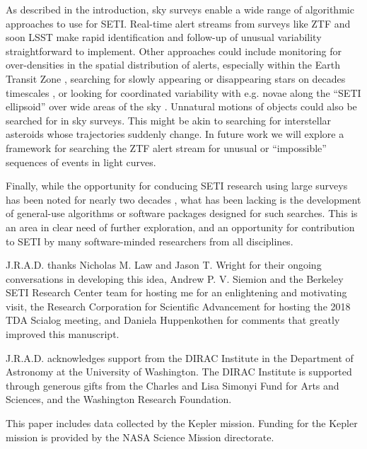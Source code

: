 \documentclass[twocolumn]{aastex62}
\begin{document}
As described in the introduction, sky surveys enable a wide range of algorithmic approaches to use for SETI. Real-time alert streams from surveys like ZTF and soon LSST \citep[e.g.][]{schwamb2019} make rapid identification and follow-up of unusual variability straightforward to implement. Other approaches could include monitoring for over-densities in the spatial distribution of alerts, especially within the Earth Transit Zone \citep{heller2016}, searching for slowly appearing or disappearing stars on decades timescales \citep{villarroel2016}, or looking for coordinated variability with e.g. novae along the ``SETI ellipsoid'' over wide areas of the sky \citep{lemarchand1994}. Unnatural motions of objects could also be searched for in sky surveys. This might be akin to searching for interstellar asteroids \citep[e.g.][]{mamajek2017} whose trajectories suddenly change. In future work we will explore a framework for searching the ZTF alert stream for unusual or ``impossible'' sequences of events in light curves.

Finally, while the opportunity for conducing SETI research using large surveys has been noted for nearly two decades \citep[e.g.][]{djorgovski2000}, what has been lacking is the development of general-use algorithms or software packages designed for such searches. This is an area in clear need of further exploration, and an opportunity for contribution to SETI by many software-minded researchers from all disciplines.



\acknowledgments

J.R.A.D. thanks Nicholas M. Law and Jason T. Wright for their ongoing conversations in developing this idea, Andrew P. V. Siemion and the Berkeley SETI Research Center team for hosting me for an enlightening and motivating visit, the Research Corporation for Scientific Advancement for hosting the 2018 TDA Scialog meeting, and Daniela Huppenkothen for comments that greatly improved this manuscript.

J.R.A.D. acknowledges support from the DIRAC Institute in the Department of Astronomy at the University of Washington. The DIRAC Institute is supported through generous gifts from the Charles and Lisa Simonyi Fund for Arts and Sciences, and the Washington Research Foundation.

This paper includes data collected by the Kepler mission. Funding for the Kepler mission is provided by the NASA Science Mission directorate.
\end{document}
